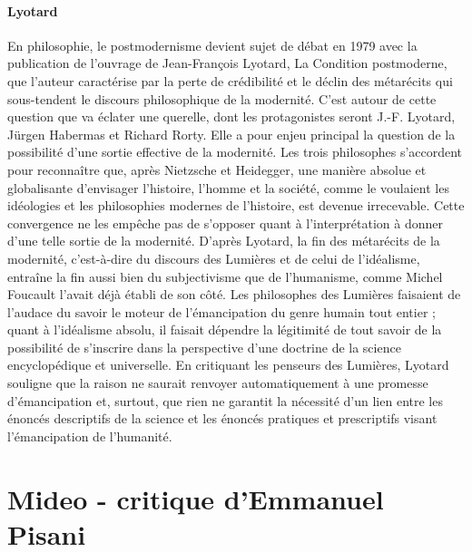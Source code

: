 \paragraph{Lyotard} En philosophie, le postmodernisme devient sujet de débat en 1979 avec la publication de l'ouvrage de Jean-François Lyotard, La Condition postmoderne, que l'auteur caractérise par la perte de crédibilité et le déclin des métarécits qui sous-tendent le discours philosophique de la modernité. C'est autour de cette question que va éclater une querelle, dont les protagonistes seront J.-F. Lyotard, Jürgen Habermas et Richard Rorty. Elle a pour enjeu principal la question de la possibilité d'une sortie effective de la modernité. Les trois philosophes s'accordent pour reconnaître que, après Nietzsche et Heidegger, une manière absolue et globalisante d'envisager l'histoire, l'homme et la société, comme le voulaient les idéologies et les philosophies modernes de l'histoire, est devenue irrecevable. Cette convergence ne les empêche pas de s'opposer quant à l'interprétation à donner d'une telle sortie de la modernité. D'après Lyotard, la fin des métarécits de la modernité, c'est-à-dire du discours des Lumières et de celui de l'idéalisme, entraîne la fin aussi bien du subjectivisme que de l'humanisme, comme Michel Foucault l'avait déjà établi de son côté. Les philosophes des Lumières faisaient de l'audace du savoir le moteur de l'émancipation du genre humain tout entier ; quant à l'idéalisme absolu, il faisait dépendre la légitimité de tout savoir de la possibilité de s'inscrire dans la perspective d'une doctrine de la science encyclopédique et universelle. En critiquant les penseurs des Lumières, Lyotard souligne que la raison ne saurait renvoyer automatiquement à une promesse d'émancipation et, surtout, que rien ne garantit la nécessité d'un lien entre les énoncés descriptifs de la science et les énoncés pratiques et prescriptifs visant l'émancipation de l'humanité. 


\section{Mideo - critique d'Emmanuel Pisani }

